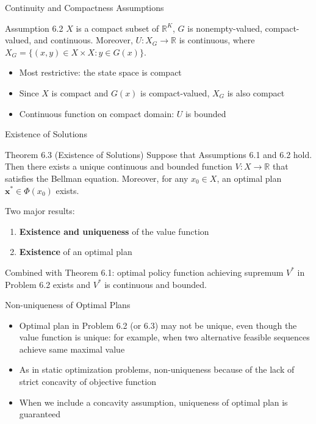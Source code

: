 \documentclass[9pt,aspectratio=169]{beamer}
\newcommand{\R}{\mathbb{R}}
\begin{document}
\begin{frame}{Continuity and Compactness Assumptions}
\begin{block}{Assumption 6.2}
$X$ is a compact subset of $\R^K$, $G$ is nonempty-valued, compact-valued, and continuous. Moreover, $U: X_G \to \R$ is continuous, where $X_G = \{(x,y) \in X \times X : y \in G(x)\}$.
\end{block}

\begin{itemize}
    \item Most restrictive: the state space is compact
    \item Since $X$ is compact and $G(x)$ is compact-valued, $X_G$ is also compact
    \item Continuous function on compact domain: $U$ is bounded
\end{itemize}
\end{frame}


\begin{frame}{Existence of Solutions}
\begin{block}{Theorem 6.3 (Existence of Solutions)}
    Suppose that Assumptions 6.1 and 6.2 hold. Then there exists a unique
    continuous and bounded function $V: X \to \R$ that satisfies the Bellman
    equation. Moreover, for any $x_0 \in X$, an optimal plan $\mathbf{x}^*
    \in \Phi(x_0)$ exists.
\end{block}

Two major results:
\begin{enumerate}
    \item \textbf{Existence and uniqueness} of the value function
    \item \textbf{Existence} of an optimal plan
\end{enumerate}

Combined with Theorem 6.1: optimal policy function achieving supremum $V^*$ in Problem 6.2 exists and $V^*$ is continuous and bounded.
\end{frame}

\begin{frame}{Non-uniqueness of Optimal Plans}
\begin{itemize}
    \item Optimal plan in Problem 6.2 (or 6.3) may not be unique, even though
    the value function is unique: for example, when two alternative feasible
    sequences achieve same maximal value
    \item As in static optimization problems, non-uniqueness because of the
    lack of strict concavity of objective function
    \item When we include a concavity assumption, uniqueness of optimal plan
    is guaranteed
\end{itemize}
\end{frame}
\end{document}
